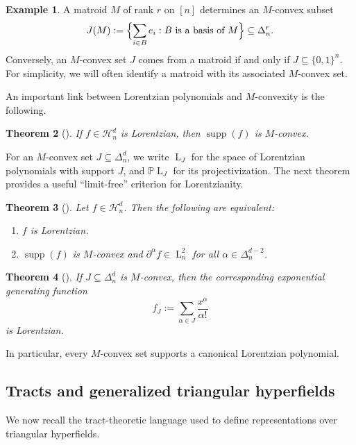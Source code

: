 \documentclass[12pt]{amsart}
\newtheorem{theorem}{Theorem}[section]
\theoremstyle{definition}
\newtheorem{example}[theorem]{Example}
\newcommand{\1}{\mathbf{1}}
\DeclareMathOperator{\upL}{L}   %
\DeclareMathOperator{\supp}{supp}
\renewcommand\P{{\mathbb P}}
\newcommand{\Hd}{\mathcal{H}^{d}}
\begin{document}
\begin{example}
A matroid $M$ of rank $r$ on $[n]$ determines an $M$-convex subset
\[
J(M):=\Bigl\{\sum_{i\in B} e_i : B \text{ is a basis of }M\Bigr\}\subseteq \Delta_n^r.
\]
Conversely, an $M$-convex set $J$ comes from a matroid if and only if
$J\subseteq \{0,1\}^n$.
For simplicity, we will often identify a matroid with its associated $M$-convex set.
\end{example}

An important link between Lorentzian polynomials and $M$-convexity is the following.

\begin{theorem}[{\cite[Proposition 2.19 and Theorem 2.23]{Branden-Huh20}}]
\label{thm:support-M-convex}
If $f\in \Hd_n$ is Lorentzian, then $\supp(f)$ is $M$-convex.
\end{theorem}

For an $M$-convex set $J\subseteq \Delta_n^d$, we write $\upL_J$ for the space of
Lorentzian polynomials with support $J$, and $\P\upL_J$ for its projectivization.
The next theorem provides a useful “limit-free” criterion for Lorentzianity.

\begin{theorem}[{\cite[Theorem 2.25]{Branden-Huh20}}]
\label{thm:BH-limit-free}
Let $f\in \Hd_n$. Then the following are equivalent:
\begin{enumerate}
\item $f$ is Lorentzian.
\item $\supp(f)$ is $M$-convex and $\partial^\alpha f\in\upL_n^2$ for all
$\alpha\in \Delta_n^{d-2}$.
\end{enumerate}
\end{theorem}

\begin{theorem}[{\cite[Theorem 3.10]{Branden-Huh20}}]
\label{thm:BH-canonical-Lorentzian}
If $J\subseteq \Delta_n^d$ is $M$-convex, then the corresponding exponential generating function
\[
f_J := \sum_{\alpha\in J} \frac{x^\alpha}{\alpha!}
\]
is Lorentzian.
\end{theorem}

In particular, every $M$-convex set supports a canonical Lorentzian polynomial.

\subsection{Tracts and generalized triangular hyperfields}

We now recall the tract-theoretic language used to define representations over triangular hyperfields.
\end{document}

